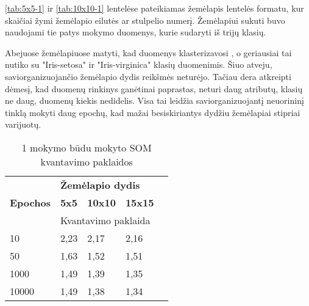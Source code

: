 \documentclass{VUMIFPSbakalaurinis}
\begin{document}
\ref{tab:5x5-1} ir \ref{tab:10x10-1} lentelėse pateikiamas
žemėlapis lentelės formatu, kur skaičiai žymi žemėlapio eilutės
ar stulpelio numerį. Žemėlapiui sukuti buvo naudojami tie patys
mokymo duomenys, kurie sudaryti iš trijų klasių.

Abejuose žemėlapiuose matyti, kad duomenys klasterizavosi
, o geriausiai tai nutiko su "Iris-setosa" ir "Iris-virginica"
klasių duomenimis. Šiuo atveju, saviorganizuojančio žemėlapio
dydis reikšmės neturėjo. Tačiau dera atkreipti dėmesį, kad
duomenų rinkinys ganėtinai paprastas, neturi daug atributų,
klasių ne daug, duomenų kiekis nedidelis. Visa tai leidžia
saviorganizuojantį neuorininį tinklą mokyti daug epochų,
kad mažai besiskiriantys dydžiu žemėlapiai stipriai varijuotų.

\begin{table}[]
  \centering
  \caption{1 mokymo būdu mokyto SOM kvantavimo paklaidos}{
    \begin{tabular}{|l|lll|l}
      \cline{1-4}
      \multirow{3}{*}{\textbf{Epochos}} & \multicolumn{3}{l|}{\textbf{Žemėlapio dydis}}                                            &  \\ \cline{2-4}
                                           & \multicolumn{1}{l|}{\textbf{5x5}} & \multicolumn{1}{l|}{\textbf{10x10}} & \textbf{15x15} &  \\ \cline{2-4}
            & \multicolumn{3}{l|}{Kvantavimo paklaida}                        &  \\ \cline{1-4}
      10    & \multicolumn{1}{l|}{2,23} & \multicolumn{1}{l|}{2,17} & 2,16    &  \\ \cline{1-4}
      50    & \multicolumn{1}{l|}{1,63} & \multicolumn{1}{l|}{1,52} & 1,51    &  \\ \cline{1-4}
      1000  & \multicolumn{1}{l|}{1,49} & \multicolumn{1}{l|}{1,39} & 1,35    &  \\ \cline{1-4}
      10000 & \multicolumn{1}{l|}{1,49} & \multicolumn{1}{l|}{1,38} & 1,34 &  \\ \cline{1-4}
      \end{tabular}}
  \label{tab:q-1}
\end{table}
\end{document}
